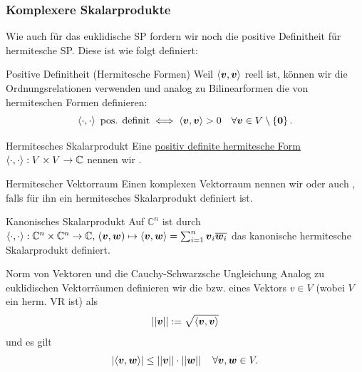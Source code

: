 \subsubsection{Komplexere Skalarprodukte}
Wie auch für das euklidische SP fordern wir noch die positive Definitheit für hermitesche SP. Diese ist wie folgt definiert:
\begin{Def}
{Positive Definitheit (Hermitesche Formen)}
Weil $\left\langle{{\text{\boldmath${v}$}}},{{\text{\boldmath${v}$}}}\right\rangle$ reell ist, können wir die Ordnungsrelationen verwenden und analog zu Bilinearformen die  von hermiteschen Formen definieren:
\begin{equation}
    \left\langle\cdot,\cdot\right\rangle\text{ pos. definit}\iff \left\langle{{\text{\boldmath${v}$}}},{{\text{\boldmath${v}$}}}\right\rangle>0\quad\forall {{\text{\boldmath${v}$}}}\in V\setminus\left\{{\text{\boldmath${0}$}}\right\}.
\end{equation}
\end{Def}
\begin{Def}
{Hermitesches Skalarprodukt}
Eine \underline{positiv definite hermitesche Form} $\left\langle\cdot,\cdot\right\rangle: V\times V\to \mathbb{C}$ nennen wir .
\end{Def}
\begin{Def}
{Hermitescher Vektorraum}
Einen komplexen Vektorraum nennen wir  oder auch , falls für ihn ein hermitesches Skalarprodukt definiert ist.
\end{Def}
\begin{Beispiel}
{Kanonisches Skalarprodukt}
Auf $\mathbb{C}^n$ ist durch $\left\langle\cdot,\cdot\right\rangle:\mathbb{C}^n\times \mathbb{C}^n\to\mathbb{C},\,({{\text{\boldmath${v}$}}},{{\text{\boldmath${w}$}}})\mapsto \left\langle{{\text{\boldmath${v}$}}},{{\text{\boldmath${w}$}}}\right\rangle=\sum_{i=1}^n{{\text{\boldmath${v}$}}}_i\overline{{{\text{\boldmath${w}$}}}_i}$ das kanonische hermitesche Skalarprodukt definiert.
\end{Beispiel}

\begin{Def}
{Norm von Vektoren und die Cauchy-Schwarzsche Ungleichung}
Analog zu euklidischen Vektorräumen definieren wir die  bzw.  eines Vektors $v\in V$ (wobei $V$ ein herm. VR ist) als
\begin{equation}
    \left|\left|{{\text{\boldmath${v}$}}}\right|\right|:=\sqrt{\left\langle{{\text{\boldmath${v}$}}},{{\text{\boldmath${v}$}}}\right\rangle}
\end{equation}
und es gilt
\begin{equation}
    \left|{\left\langle{{\text{\boldmath${v}$}}},{{\text{\boldmath${w}$}}}\right\rangle}\right|\leq \left|\left|{{\text{\boldmath${v}$}}}\right|\right|\cdot\left|\left|{{\text{\boldmath${w}$}}}\right|\right|\quad \forall {{\text{\boldmath${v}$}}},{{\text{\boldmath${w}$}}}\in V.
\end{equation}
\end{Def}

